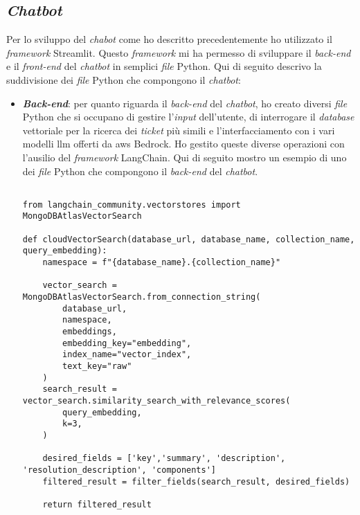 \subsection{\textit{Chatbot}}
Per lo sviluppo del \textit{chabot} come ho descritto precedentemente ho utilizzato il \textit{framework} Streamlit. Questo \textit{framework} mi ha permesso di sviluppare il \textit{back-end} e il \textit{front-end} del \textit{chatbot} in semplici \textit{file} Python.
Qui di seguito descrivo la suddivisione dei \textit{file} Python che compongono il \textit{chatbot}:
\begin{itemize}
    \item \textbf{\textit{Back-end}}: per quanto riguarda il \textit{back-end} del \textit{chatbot}, ho creato diversi \textit{file} Python che si occupano di gestire l'\textit{input} dell'utente, di interrogare il \textit{database} vettoriale per la ricerca dei \textit{ticket} più simili e l'interfacciamento con i vari modelli \gls{llm} offerti da \gls{aws} Bedrock. Ho gestito queste diverse operazioni con l'ausilio del \textit{framework} LangChain. Qui di seguito mostro un esempio di uno dei \textit{file} Python che compongono il \textit{back-end} del \textit{chatbot}.
    \begin{verbatim}

from langchain_community.vectorstores import MongoDBAtlasVectorSearch

def cloudVectorSearch(database_url, database_name, collection_name, query_embedding):
    namespace = f"{database_name}.{collection_name}"

    vector_search = MongoDBAtlasVectorSearch.from_connection_string(
        database_url,
        namespace,
        embeddings,
        embedding_key="embedding",
        index_name="vector_index",
        text_key="raw"
    )
    search_result = vector_search.similarity_search_with_relevance_scores(
        query_embedding,
        k=3,
    )

    desired_fields = ['key','summary', 'description', 'resolution_description', 'components']
    filtered_result = filter_fields(search_result, desired_fields)

    return filtered_result
    \end{verbatim}
    \vspace{-0.3cm}
    \label{lst:cloudVectorSearch}
    \vspace{0.3cm}


\end{itemize}

